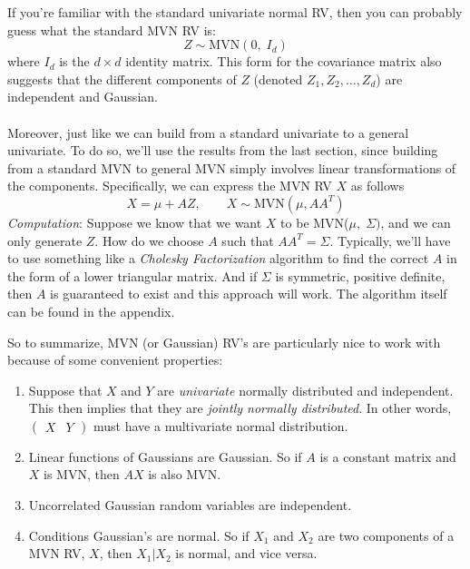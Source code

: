 \documentclass[12pt]{article}
\theoremstyle{plain}
\theoremstyle{definition}
\theoremstyle{remark}
\begin{document}
If you're familiar with the standard univariate normal RV,
then you can probably guess what the standard MVN RV is:
\begin{equation}
    {Z} \sim \text{MVN}(0, \; I_d)
\end{equation}
where $I_d$ is the $d\times d$ identity matrix.  This form for
the covariance matrix also suggests that the different components
of ${Z}$ (denoted $Z_1, Z_2, \ldots, Z_d$) are independent and
Gaussian.
\\
\\
Moreover, just like we can build from a standard univariate to
a general univariate.  To do so, we'll use the results from the
last section, since building from a standard MVN
to general MVN simply involves linear transformations of the components.
Specifically, we can express the MVN RV ${X}$ as follows
\begin{equation}
    {X} = \mu + A{Z}, \qquad {X}\sim
	\text{MVN}(\mu, AA^T)
\end{equation}
{\sl Computation}: Suppose we know that we want ${X}$ to
be MVN($\mu, \; \Sigma)$, and we can only generate ${Z}$.
How do we choose $A$ such that $AA^T = \Sigma$.  Typically, we'll
have to use something like a \emph{Cholesky Factorization}
algorithm to find the correct $A$ in the form of a lower triangular
matrix. And if $\Sigma$ is symmetric, positive definite, then
$A$ is guaranteed to exist and this approach will work.
The algorithm itself can be found in the appendix.


So to summarize, MVN (or Gaussian) RV's are particularly nice to work with because
of some convenient properties:
\begin{enumerate}
    \item Suppose that ${X}$ and ${Y}$ are \emph{univariate}
	normally distributed and independent. This then implies that they are
	\emph{jointly normally distributed}. In other words,
	$\begin{pmatrix} {X} & {Y} \end{pmatrix}$ must have a multivariate
	normal distribution.
    \item Linear functions of Gaussians are Gaussian. So if $A$
	is a constant matrix and ${X}$ is MVN, then $A{X}$
	is also MVN.
    \item Uncorrelated Gaussian random variables are independent.
    \item Conditions Gaussian's are normal. So if $X_1$ and $X_2$
	are two components of a MVN RV, ${X}$, then
	$X_1 | X_2$ is normal, and vice versa.
\end{enumerate}
\end{document}
